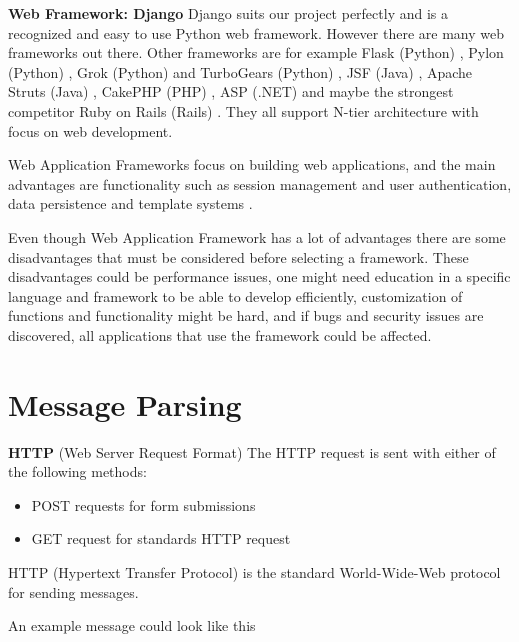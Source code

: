 \documentclass{sig-alt-release2}
\begin{document}
\textbf{Web Framework: Django}
Django suits our project perfectly and is a recognized and easy to use Python web framework. However there are many web frameworks out there. Other frameworks are for example Flask (Python) , Pylon (Python) \cite{x2}, Grok (Python) \cite{x3} and TurboGears (Python) \cite{x4}, JSF (Java) \cite{x5}, Apache Struts (Java) \cite{x6}, CakePHP (PHP) \cite{x7}, ASP (.NET) \cite{x8} and maybe the strongest competitor Ruby on Rails (Rails) \cite{x9} \cite{x19}. They all support N-tier architecture with focus on web development.
 
Web Application Frameworks focus on building web applications, and the main advantages are functionality such as session management and user authentication, data persistence and template systems \cite{x10}.

Even though Web Application Framework has a lot of advantages there are some disadvantages that must be considered before selecting a framework. These disadvantages could be performance issues, one might need education in a specific language and framework to be able to develop efficiently, customization of functions and functionality might be hard, and if bugs and security issues are discovered, all applications that use the framework could be affected. \cite{x11}

\section{Message Parsing}

\textbf{HTTP} (Web Server Request Format)
The HTTP request is sent with either of the following methods:
\begin{itemize}
\item POST requests for form submissions
\item GET request for standards HTTP request
\end{itemize}
HTTP (Hypertext Transfer Protocol) is the standard World-Wide-Web protocol for sending messages.

An example message could look like this
\end{document}
